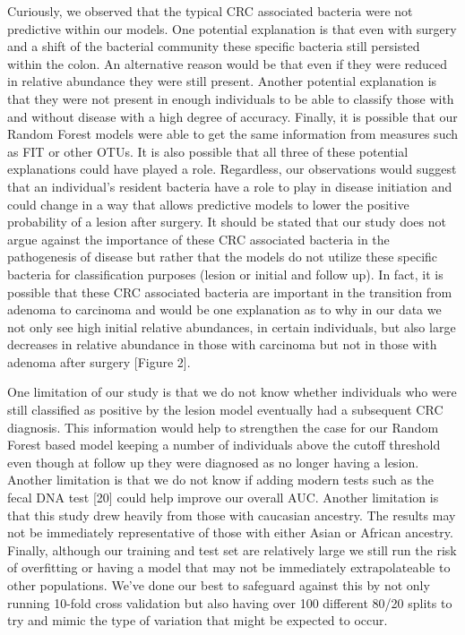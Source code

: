 \documentclass[12pt,]{article}
\begin{document}
Curiously, we observed that the typical CRC associated bacteria were not
predictive within our models. One potential explanation is that even
with surgery and a shift of the bacterial community these specific
bacteria still persisted within the colon. An alternative reason would
be that even if they were reduced in relative abundance they were still
present. Another potential explanation is that they were not present in
enough individuals to be able to classify those with and without disease
with a high degree of accuracy. Finally, it is possible that our Random
Forest models were able to get the same information from measures such
as FIT or other OTUs. It is also possible that all three of these
potential explanations could have played a role. Regardless, our
observations would suggest that an individual's resident bacteria have a
role to play in disease initiation and could change in a way that allows
predictive models to lower the positive probability of a lesion after
surgery. It should be stated that our study does not argue against the
importance of these CRC associated bacteria in the pathogenesis of
disease but rather that the models do not utilize these specific
bacteria for classification purposes (lesion or initial and follow up).
In fact, it is possible that these CRC associated bacteria are important
in the transition from adenoma to carcinoma and would be one explanation
as to why in our data we not only see high initial relative abundances,
in certain individuals, but also large decreases in relative abundance
in those with carcinoma but not in those with adenoma after surgery
{[}Figure 2{]}.

One limitation of our study is that we do not know whether individuals
who were still classified as positive by the lesion model eventually had
a subsequent CRC diagnosis. This information would help to strengthen
the case for our Random Forest based model keeping a number of
individuals above the cutoff threshold even though at follow up they
were diagnosed as no longer having a lesion. Another limitation is that
we do not know if adding modern tests such as the fecal DNA test
{[}20{]} could help improve our overall AUC. Another limitation is that
this study drew heavily from those with caucasian ancestry. The results
may not be immediately representative of those with either Asian or
African ancestry. Finally, although our training and test set are
relatively large we still run the risk of overfitting or having a model
that may not be immediately extrapolateable to other populations. We've
done our best to safeguard against this by not only running 10-fold
cross validation but also having over 100 different 80/20 splits to try
and mimic the type of variation that might be expected to occur.
\end{document}

